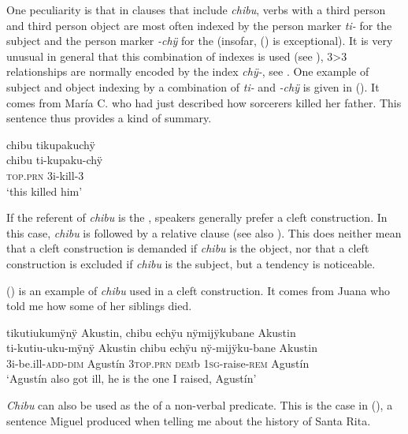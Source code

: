One peculiarity is that in clauses that include \textit{chibu}, verbs with a third person  and third person object are most often indexed by the person marker \textit{ti-} for the subject and the person marker \textit{-chÿ} for the  (insofar, () is exceptional). It is very unusual in general that this combination of indexes is used (see ), 3>3 relationships are normally encoded by the index \textit{chÿ-}, see . One example of subject and object indexing by a combination of \textit{ti-} and \textit{-chÿ} is given in (). It comes from María C. who had just described how sorcerers killed her father. This sentence thus provides a kind of summary.

\ea\label{ex:chibu-15}
\begingl
\glpreamble chibu tikupakuchÿ\\
\gla chibu ti-kupaku-chÿ\\
\textsc{top.prn} 3i-kill-3\\
\glft ‘this killed him’
\endgl
\trailingcitation{[ump-p110815sf.165]}
\xe

If the referent of \textit{chibu} is the , speakers generally prefer a cleft construction. In this case, \textit{chibu} is followed by a relative clause (see also ). This does neither mean that a cleft construction is demanded if \textit{chibu} is the object, nor that a cleft construction is excluded if \textit{chibu} is the subject, but a tendency is noticeable.

() is an example of \textit{chibu} used in a cleft construction. It comes from Juana who told me how some of her siblings died.

\ea\label{ex:chibu-8}
\begingl
\glpreamble tikutiukumÿnÿ Akustin, chibu echÿu nÿmijÿkubane Akustin\\
\gla ti-kutiu-uku-mÿnÿ Akustin chibu echÿu nÿ-mijÿku-bane Akustin\\
\glb 3i-be.ill-\textsc{add}-\textsc{dim} Agustín 3\textsc{top.prn} \textsc{dem}b 1\textsc{sg}-raise-\textsc{rem} Agustín\\
\glft ‘Agustín also got ill, he is the one I raised, Agustín’
\endgl
\trailingcitation{[jxx-p120430l-2.473-474]}
\xe
{}

\textit{Chibu} can also be used as the  of a non-verbal predicate. This is the case in (), a sentence Miguel produced when telling me about the history of Santa Rita.

